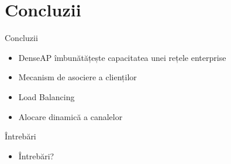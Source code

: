\section{Concluzii}

\begin{frame}{Concluzii}
  \begin{itemize}
    \item DenseAP îmbunătățește capacitatea unei rețele enterprise
    \item Mecanism de asociere a clienților
    \item Load Balancing
    \item Alocare dinamică a canalelor
  \end{itemize}
\end{frame}

\begin{frame}{Întrebări}
  \begin{itemize}
    \item Întrebări?
  \end{itemize}
\end{frame}
